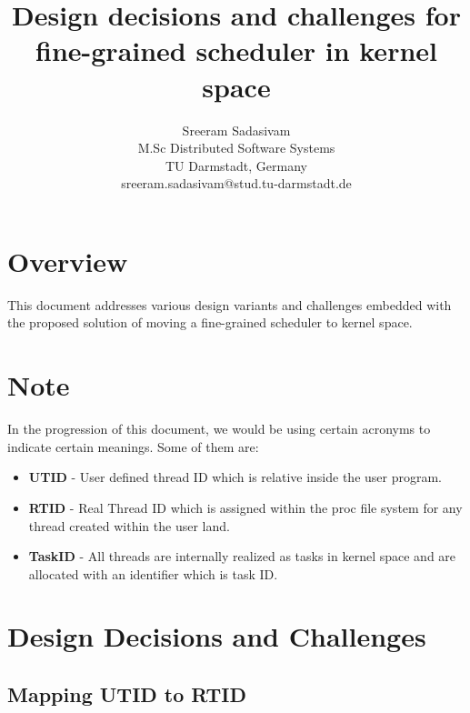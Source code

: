 \documentclass[12pt]{article}
\begin{document}
\title{\vspace{-3.5cm} Design decisions and challenges for fine-grained scheduler in kernel space}


\author{
		 Sreeram Sadasivam\\
		M.Sc Distributed Software Systems\\
		TU Darmstadt, Germany\\
		sreeram.sadasivam@stud.tu-darmstadt.de
}

\date{}


\maketitle




\section*{Overview}

This document addresses various design variants and challenges embedded with the proposed solution of moving a fine-grained scheduler to kernel space. 

\section*{Note}
In the progression of this document, we would be using certain acronyms to indicate certain meanings. 
Some of them are:
\begin{itemize}
\item \textbf{UTID} - User defined thread ID which is relative inside the user program. 
\item \textbf{RTID} - Real Thread ID which is assigned within the proc file system for any thread created within the user land. 
\item \textbf{TaskID} - All threads are internally realized as tasks in kernel space and are allocated with an identifier which is task ID.
\end{itemize}

\section*{Design Decisions and Challenges}

\subsection*{Mapping UTID to RTID}
\end{document}

